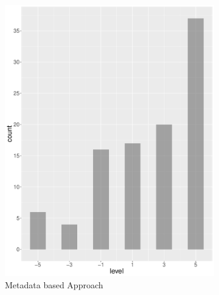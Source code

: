 \begin{figure}
\begin{subfigure}[b]{0.4\textwidth}
        \includegraphics[width=\textwidth]{plots/climate_change/hist_level_ec}
        \caption{Metadata based Approach}
        \label{fig:hist_level_climate_change_ec}
    \end{subfigure}
    ~
    \begin{subfigure}[b]{0.4\textwidth}

\end{subfigure}
\end{figure}
